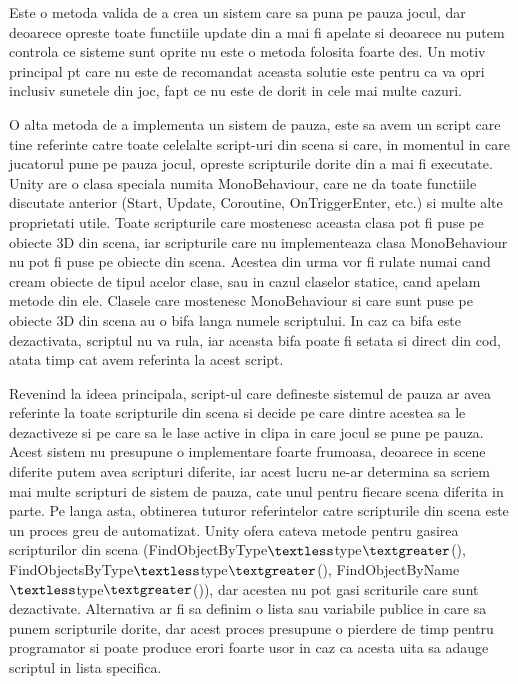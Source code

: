 \documentclass[12pt, a4paper]{article}
\begin{document}
	Este o metoda valida de a crea un sistem care sa puna pe pauza jocul, dar deoarece opreste toate functiile update din a mai fi apelate si deoarece nu putem controla ce sisteme sunt oprite nu este o metoda folosita foarte des. Un motiv principal pt care nu este de recomandat aceasta solutie este pentru ca va opri inclusiv sunetele din joc, fapt ce nu este de dorit in cele mai multe cazuri.
	\newline
	
	O alta metoda de a implementa un sistem de pauza, este sa avem un script care tine referinte catre toate celelalte script-uri din scena si care, in momentul in care jucatorul pune pe pauza jocul, opreste scripturile dorite din a mai fi executate. Unity are o clasa speciala numita MonoBehaviour, care ne da toate functiile discutate anterior (Start, Update, Coroutine, OnTriggerEnter, etc.) si multe alte proprietati utile. Toate scripturile care mostenesc aceasta clasa pot fi puse pe obiecte 3D din scena, iar scripturile care nu implementeaza clasa MonoBehaviour nu pot fi puse pe obiecte din scena. Acestea din urma vor fi rulate numai cand cream obiecte de tipul acelor clase, sau in cazul claselor statice, cand apelam metode din ele. Clasele care mostenesc MonoBehaviour si care sunt puse pe obiecte 3D din scena au o bifa langa numele scriptului. In caz ca bifa este dezactivata, scriptul nu va rula, iar aceasta bifa poate fi setata si direct din cod, atata timp cat avem referinta la acest script. 
	\newline
	
	Revenind la ideea principala, script-ul care defineste sistemul de pauza ar avea referinte la toate scripturile din scena si decide pe care dintre acestea sa le dezactiveze si pe care sa le lase active in clipa in care jocul se pune pe pauza. Acest sistem nu presupune o implementare foarte frumoasa, deoarece in scene diferite putem avea scripturi diferite, iar acest lucru ne-ar determina sa scriem mai multe scripturi de sistem de pauza, cate unul pentru fiecare scena diferita in parte. Pe langa asta, obtinerea tuturor referintelor catre scripturile din scena este un proces greu de automatizat. Unity ofera cateva metode pentru gasirea scripturilor din scena (FindObjectByType$\textless$type$\textgreater$(), FindObjectsByType$\textless$type$\textgreater$(), FindObjectByName$\textless$type$\textgreater$()), dar acestea nu pot gasi scriturile care sunt dezactivate. Alternativa ar fi sa definim o lista sau variabile publice in care sa punem scripturile dorite, dar acest proces presupune o pierdere de timp pentru programator si poate produce erori foarte usor in caz ca acesta uita sa adauge scriptul in lista specifica.
	\newline
	
\end{document}
